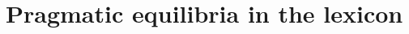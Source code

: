 \documentclass[man]{apa2}
\begin{document}







\section{Pragmatic equilibria in the lexicon}
\end{document}
